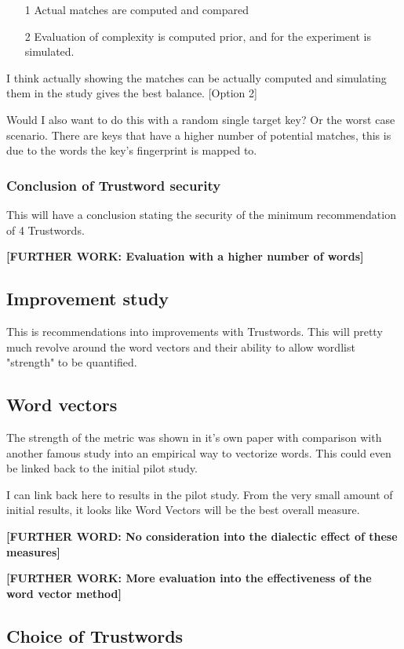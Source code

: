 \begin{itemize}
    \item[1] Actual matches are computed and compared
    \item[2] Evaluation of complexity is computed prior, and for the experiment is simulated.
\end{itemize}

I think actually showing the matches can be actually computed and simulating them in the study gives the best balance. [Option 2]

Would I also want to do this with a random single target key? Or the worst case scenario. There are keys that have a higher number of potential matches, this is due to the words the key's fingerprint is mapped to.

\subsubsection{Conclusion of Trustword security}
This will have a conclusion stating the security of the minimum recommendation of 4 Trustwords.

\textbf{[FURTHER WORK: Evaluation with a higher number of words]}

\subsection{Improvement study}

This 
is recommendations into improvements with Trustwords. This will pretty much revolve around the word vectors and their ability to allow wordlist "strength" to be quantified. 

\subsection*{Word vectors}
The strength of the metric was shown in it's own paper with comparison with another famous study into an empirical way to vectorize words. This could even be linked back to the initial pilot study.

I can link back here to results in the pilot study. From the very small amount of initial results, it looks like Word Vectors will be the best overall measure.

\textbf{[FURTHER WORD: No consideration into the dialectic effect of these measures]}

\textbf{[FURTHER WORK: More evaluation into the effectiveness of the word vector method]}

\subsection*{Choice of Trustwords}

